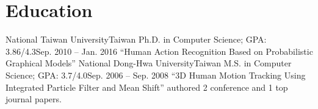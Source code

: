 \section{Education}
  \resumeSubHeadingListStart
    \resumeSubheading
      {National Taiwan University}{Taiwan}
      {Ph.D. in Computer Science; GPA: 3.86/4.3}{Sep. 2010 -- Jan. 2016}
      \resumeItemListStart
        {``Human Action Recognition Based on Probabilistic Graphical Models”}{}
      \resumeItemListEnd
    \resumeSubheading
      {National Dong-Hwa University}{Taiwan}
      {M.S. in Computer Science;  GPA: 3.7/4.0}{Sep. 2006 -- Sep. 2008}
    \resumeItemListStart
        {``3D Human Motion Tracking Using Integrated Particle Filter and Mean Shift”}{}
        {authored 2 conference and 1 top journal papers.}{}
        
      \resumeItemListEnd
  \resumeSubHeadingListEnd